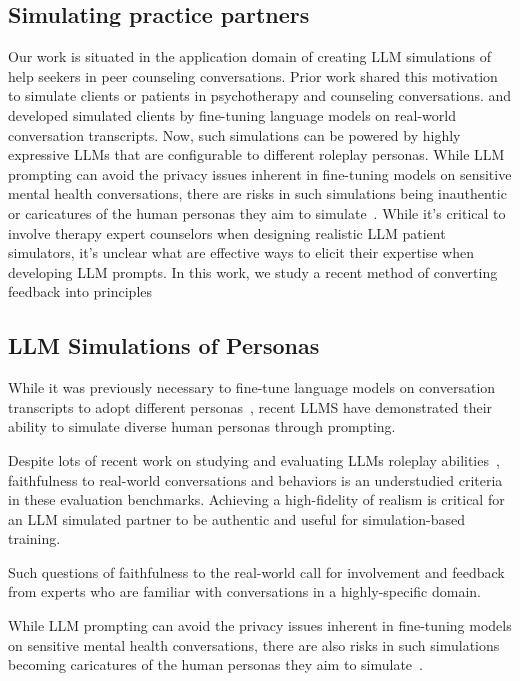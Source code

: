 \subsection{Simulating practice partners}
Our work is situated in the application domain of creating LLM simulations of help seekers in peer counseling conversations. Prior work shared this motivation to simulate clients or patients in psychotherapy and counseling conversations. \citeauthor{tanana2019development} and \citeauthor{demasi-etal-2020-multi} developed simulated clients by fine-tuning language models on real-world conversation transcripts. Now, such simulations can be powered by highly expressive LLMs that are configurable to different roleplay personas. While LLM prompting can avoid the privacy issues inherent in fine-tuning models on sensitive mental health conversations, there are risks in such simulations being inauthentic or caricatures of the human personas they aim to simulate~\cite{cheng-etal-2023-compost}. While it's critical to involve therapy expert counselors when designing realistic LLM patient simulators, it's unclear what are effective ways to elicit their expertise when developing LLM prompts. In this work, we study a recent method of converting feedback into principles 


\subsection{LLM Simulations of Personas}

While it was previously necessary to fine-tune language models on conversation transcripts to adopt different personas~\cite{demasi-etal-2020-multi}, recent LLMS have demonstrated their ability to simulate diverse human personas through prompting.

Despite lots of recent work on studying and evaluating LLMs roleplay abilities~\cite{zhou2023sotopia}, faithfulness to real-world conversations and behaviors is an understudied criteria in these evaluation benchmarks.  Achieving a high-fidelity of realism is critical for an LLM simulated partner to be authentic and useful for simulation-based training. 

Such questions of faithfulness to the real-world call for involvement and feedback from experts who are familiar with conversations in a highly-specific domain. 

While LLM prompting can avoid the privacy issues inherent in fine-tuning models on sensitive mental health conversations, there are also risks in such simulations becoming caricatures of the human personas they aim to simulate~\cite{cheng-etal-2023-compost}.
\fi
